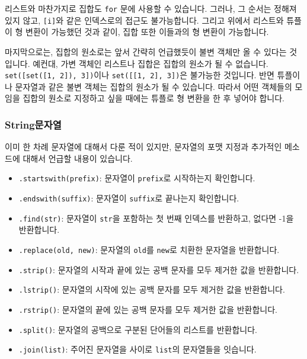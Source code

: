 \documentclass[../main.tex]{subfiles}
\begin{document}
리스트와 마찬가지로 집합도 \texttt{for} 문에 사용할 수 있습니다.
그러나, 그 순서는 정해져 있지 않고, \texttt{[i]}와 같은 인덱스로의 접근도 불가능합니다.
그리고 위에서 리스트와 튜플이 형 변환이 가능했던 것과 같이, 집합 또한 이들과의 형 변환이 가능합니다.

마지막으로는, 집합의 원소로는 앞서 간략히 언급했듯이 불변 객체만 올 수 있다는 것입니다.
예컨대, 가변 객체인 리스트나 집합은 집합의 원소가 될 수 없습니다.
\texttt{set([set([1, 2]), 3])}이나 \texttt{set([[1, 2], 3])}은 불가능한 것입니다.
반면 튜플이나 문자열과 같은 불변 객체는 집합의 원소가 될 수 있습니다.
따라서 어떤 객체들의 모임을 집합의 원소로 지정하고 싶을 때에는 튜플로 형 변환을 한 후 넣어야 합니다.

\subsubsection{String문자열}
이미 한 차례 문자열에 대해서 다룬 적이 있지만, 문자열의 포맷 지정과 추가적인 메소드에 대해서 언급할 내용이 있습니다.
\begin{itemize}
	\item \texttt{.startswith(prefix)}: 문자열이 \texttt{prefix}로 시작하는지 확인합니다.
	\item \texttt{.endswith(suffix)}: 문자열이 \texttt{suffix}로 끝나는지 확인합니다.
	\item \texttt{.find(str)}: 문자열이 \texttt{str}을 포함하는 첫 번째 인덱스를 반환하고, 없다면 -1을 반환합니다.
	\item \texttt{.replace(old, new)}: 문자열의 \texttt{old}를 \texttt{new}로 치환한 문자열을 반환합니다.
	\item \texttt{.strip()}: 문자열의 시작과 끝에 있는 공백 문자를 모두 제거한 값을 반환합니다.
	\item \texttt{.lstrip()}: 문자열의 시작에 있는 공백 문자를 모두 제거한 값을 반환합니다.
	\item \texttt{.rstrip()}: 문자열의 끝에 있는 공백 문자를 모두 제거한 값을 반환합니다.
	\item \texttt{.split()}: 문자열의 공백으로 구분된 단어들의 리스트를 반환합니다.
	\item \texttt{.join(list)}: 주어진 문자열을 사이로 \texttt{list}의 문자열들을 잇습니다.
\end{itemize}
\end{document}
